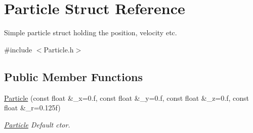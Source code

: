 \hypertarget{structParticle}{}\section{Particle Struct Reference}
\label{structParticle}


Simple particle struct holding the position, velocity etc.  




{\ttfamily \#include $<$Particle.\+h$>$}

\subsection*{Public Member Functions}
\begin{DoxyCompactItemize}
\item 
\hyperlink{structParticle_ac27e166117e21a32c2a0dfe4bd6fd8bd}{Particle} (const float \&\+\_\+x=0.f, const float \&\+\_\+y=0.f, const float \&\+\_\+z=0.f, const float \&\+\_\+r=0.\+125f)
\begin{DoxyCompactList}\small\item\em \hyperlink{structParticle}{Particle} Default ctor. \end{DoxyCompactList}\end{DoxyCompactItemize}
